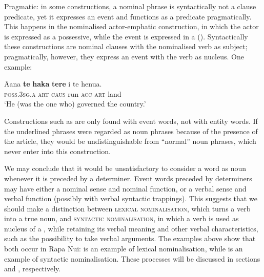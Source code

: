 Pragmatic: in some constructions, a nominal phrase is syntactically not a clause predicate, yet it expresses an event and functions as a predicate pragmatically. This happens in the nominalised actor-emphatic construction, in which the actor is expressed as a possessive, while the event is expressed in a  (). Syntactically these constructions are nominal clauses with the nominalised verb as subject; pragmatically, however, they express an event with the verb as nucleus. One example:

\ea\label{ex:3.11}
\gll {\ꞌ}Ā{\ꞌ}ana \textbf{te} \textbf{haka} \textbf{tere} i te henua.\\
\textsc{poss.3sg.a} \textsc{art} \textsc{caus} run \textsc{acc} \textsc{art} land\\

\glt
‘He (was the one who) governed the country.’ \textstyleExampleref{[R370.005]} 
\z

Constructions such as  are only found with event words, not with entity words. If the underlined phrases were regarded as noun phrases because of the presence of the article, they would be undistinguishable from “normal” noun phrases, which never enter into this construction.

We may conclude that it would be unsatisfactory to consider a word as noun whenever it is preceded by a determiner. Event words preceded by determiners may have either a nominal sense and nominal function, or a verbal sense and verbal function (possibly with verbal syntactic trappings). This suggests that we should make a distinction between \textsc{lexical nominalisation}, which turns a verb into a true noun, and \textsc{syntactic nominalisation}, in which a verb is used as nucleus of a , while retaining its verbal meaning and other verbal characteristics, such as the possibility to take verbal arguments. The examples above show that both occur in Rapa Nui:  is an example of lexical nominalisation, while  is an example of syntactic nominalisation. These processes will be discussed in sections  and , respectively.

\largerpage
